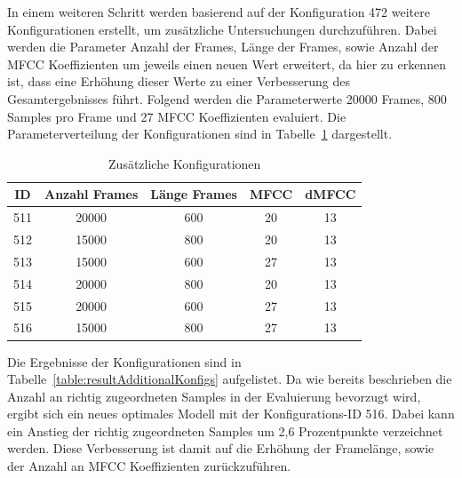 In einem weiteren Schritt werden basierend auf der Konfiguration 472 weitere Konfigurationen erstellt, um zusätzliche Untersuchungen durchzuführen.
Dabei werden die Parameter Anzahl der Frames, Länge der Frames, sowie Anzahl der \ac{MFCC} Koeffizienten um jeweils einen neuen Wert erweitert, da hier zu erkennen ist, dass eine Erhöhung dieser Werte zu einer Verbesserung des Gesamtergebnisses führt.
Folgend werden die Parameterwerte 20000 Frames, 800 Samples pro Frame und 27 \ac{MFCC} Koeffizienten evaluiert.
Die Parameterverteilung der Konfigurationen sind in Tabelle~\ref{table:additionalKonfigs} dargestellt.
\begin{table}[H]
    \centering
    \begin{tabular}{c|c|c|c|c}
    ID  & Anzahl Frames & Länge Frames & \ac{MFCC} & \ac{dMFCC} \\ \hline
    511 & 20000         & 600          & 20        & 13         \\ \hline
    512 & 15000         & 800          & 20        & 13         \\ \hline
    513 & 15000         & 600          & 27        & 13         \\ \hline
    514 & 20000         & 800          & 20        & 13         \\ \hline
    515 & 20000         & 600          & 27        & 13         \\ \hline
    516 & 15000         & 800          & 27        & 13    
    \end{tabular}
    \caption{Zusätzliche Konfigurationen}
    \label{table:additionalKonfigs}
\end{table}
Die Ergebnisse der Konfigurationen sind in Tabelle~\ref{table:resultAdditionalKonfigs} aufgelistet.
Da wie bereits beschrieben die Anzahl an richtig zugeordneten Samples in der Evaluierung bevorzugt wird, ergibt sich ein neues optimales Modell mit der Konfigurations-ID 516.
Dabei kann ein Anstieg der richtig zugeordneten Samples um 2,6 Prozentpunkte verzeichnet werden.
Diese Verbesserung ist damit auf die Erhöhung der Framelänge, sowie der Anzahl an \ac{MFCC} Koeffizienten zurückzuführen.

